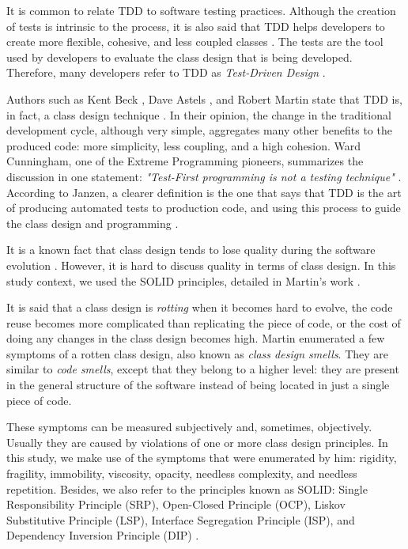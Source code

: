 \documentclass[times]{elsarticle}
\begin{document}
It is common to relate TDD to software testing practices. Although the creation
of tests is intrinsic to the process, it is also said that TDD helps developers
to create more flexible, cohesive, and less coupled classes \cite{tdd-taxonomy}. 
The tests are the tool used by developers to evaluate the class design that is being developed.
Therefore, many developers refer to TDD 
as \textit{Test-Driven Design} \cite{tdd-taxonomy}.

Authors such as Kent Beck \cite{aim-fire}, Dave Astels \cite{astels-tdd}, and
Robert Martin \cite{bob-martin} state that TDD is, in fact, a class design
technique \cite{tdd-taxonomy} \cite{aim-fire}.
In their opinion, the change in the traditional development cycle, although very simple,
aggregates many other benefits to the produced code: more simplicity, less coupling, and
a high cohesion. Ward Cunningham, one of the Extreme Programming pioneers, summarizes
the discussion in one statement: \textit{"Test-First programming is not a testing technique"} 
\cite{aim-fire}.
According to Janzen, a clearer definition is the one that says that TDD is the 
art of producing automated tests to production code, and using this process to guide
the class design and programming \cite{agilealliance-tdd} \cite{tdd-taxonomy}.

It is a known fact that class design tends to lose quality during the software evolution \cite{evolution-lehman}.
However, it is hard to discuss quality in terms of class design. In this study context,
we used the SOLID principles, detailed in Martin's work \cite{bob-martin}.

It is said that a class design is \textit{rotting} when it becomes hard
to evolve, the code reuse becomes more complicated than replicating the piece
of code, or the cost of doing any changes in the class design becomes high.
Martin \cite{bob-martin} enumerated a few symptoms of a rotten class design,
also known as \textit{class design smells}. They are similar to \textit{code smells},
except that they belong to a higher level: they are present in the general structure
of the software instead of being located in just a single piece of code.

These symptoms can be measured subjectively and, sometimes, objectively. Usually
they are caused by violations of one or more class design principles.
In this study, we make use of the symptoms that were enumerated by him: 
rigidity, fragility, immobility, viscosity, opacity, needless complexity, and
needless repetition. Besides, we also refer to the principles known as SOLID:
Single Responsibility Principle (SRP), Open-Closed Principle (OCP),
Liskov Substitutive Principle (LSP), Interface Segregation Principle (ISP), and
Dependency Inversion Principle (DIP) \cite{bob-martin}.
\end{document}
